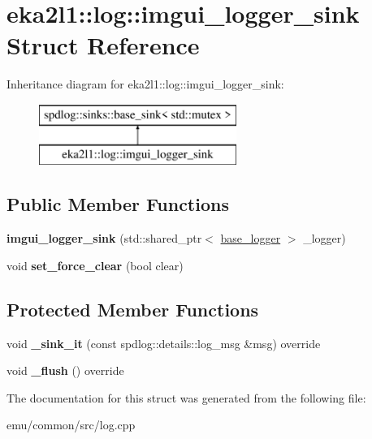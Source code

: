 \hypertarget{structeka2l1_1_1log_1_1imgui__logger__sink}{}\section{eka2l1\+:\+:log\+:\+:imgui\+\_\+logger\+\_\+sink Struct Reference}
\label{structeka2l1_1_1log_1_1imgui__logger__sink}
Inheritance diagram for eka2l1\+:\+:log\+:\+:imgui\+\_\+logger\+\_\+sink\+:\begin{figure}[H]
\begin{center}
\leavevmode
\includegraphics[height=2.000000cm]{structeka2l1_1_1log_1_1imgui__logger__sink}
\end{center}
\end{figure}
\subsection*{Public Member Functions}
\begin{DoxyCompactItemize}
\item 
\mbox{\label{structeka2l1_1_1log_1_1imgui__logger__sink_afa741859eb8591c5b03eb850126b318c}} 
{\bfseries imgui\+\_\+logger\+\_\+sink} (std\+::shared\+\_\+ptr$<$ \mbox{\hyperlink{classeka2l1_1_1base__logger}{base\+\_\+logger}} $>$ \+\_\+logger)
\item 
\mbox{\label{structeka2l1_1_1log_1_1imgui__logger__sink_a5371d38b44d12db5f403f158399412c0}} 
void {\bfseries set\+\_\+force\+\_\+clear} (bool clear)
\end{DoxyCompactItemize}
\subsection*{Protected Member Functions}
\begin{DoxyCompactItemize}
\item 
\mbox{\label{structeka2l1_1_1log_1_1imgui__logger__sink_aba4ae2eac7bc1b558ca0fa2cfe09f072}} 
void {\bfseries \+\_\+sink\+\_\+it} (const spdlog\+::details\+::log\+\_\+msg \&msg) override
\item 
\mbox{\label{structeka2l1_1_1log_1_1imgui__logger__sink_ad87fd8cfbf546d5414dfe52fa2dcf411}} 
void {\bfseries \+\_\+flush} () override
\end{DoxyCompactItemize}


The documentation for this struct was generated from the following file\+:\begin{DoxyCompactItemize}
\item 
emu/common/src/log.\+cpp\end{DoxyCompactItemize}
